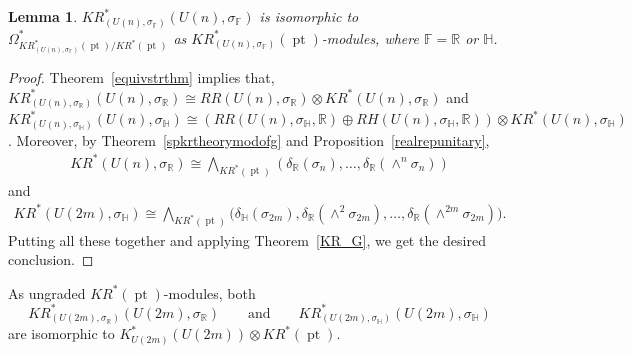 \documentclass[pdftex]{sigma}
\numberwithin{equation}{section}
\newtheorem{Lemma}[Theorem]{Lemma}
\DeclareMathOperator{\pt}{pt}
\begin{document}
\begin{Lemma}
$KR^*_{(U(n),
\sigma_\mathbb{\mathbb{F}})}\!(U(n){,}
\sigma_\mathbb{F})$ is isomorphic to $\Omega^*_{KR^*_{(U(n),
\sigma_\mathbb{F})}(\pt)/ KR^*(\pt)}\!$ as $KR^*_{(U(n),
\sigma_\mathbb{F})}(\pt)$-modules,
where $\mathbb{F}=\mathbb{R}$ or $\mathbb{H}$.
\end{Lemma}
\begin{proof}
Theorem~\ref{equivstrthm} implies that, $KR^*_{(U(n),
\sigma_\mathbb{R})}(U(n),
\sigma_\mathbb{R})\cong RR(U(n),
\sigma_\mathbb{R})\otimes KR^*(U(n),
\sigma_\mathbb{R})$ and $KR^*_{(U(n),
\sigma_\mathbb{H})}(U(n),
\sigma_\mathbb{H})\cong (RR(U(n),
\sigma_\mathbb{H}, \mathbb{R})\oplus RH(U(n),
\sigma_\mathbb{H}, \mathbb{R}))\otimes KR^*(U(n),
\sigma_\mathbb{H})$.
Moreover, by Theorem~\ref{spkrtheorymodofg} and Proposition~\ref{realrepunitary},
\begin{gather*}
KR^*(U(n),
\sigma_\mathbb{R})\cong \bigwedge\nolimits_{KR^*(\pt)}(\delta_\mathbb{R}(\sigma_n), \dots, \delta_\mathbb{R}
(\wedge^n
\sigma_n))
\end{gather*}
and
\begin{gather*}
KR^*(U(2m),
\sigma_\mathbb{H})\cong\bigwedge\nolimits_{KR^*(\pt)}\big(\delta_\mathbb{H}(\sigma_{2m}), \delta_\mathbb{R}(\wedge^2
\sigma_{2m}), \dots, \delta_\mathbb{R}(\wedge^{2m}\sigma_{2m})\big).
\end{gather*}
Putting all these together and applying Theorem~\ref{KR_G}, we get the desired conclusion.
\end{proof}
\begin{Remark}
\label{ungradediso}
As ungraded $KR^*(\pt)$-modules, both
\[
KR_{(U(2m),
\sigma_\mathbb{R})}^*(U(2m),
\sigma_\mathbb{R}) \qquad \text{and}\qquad KR^*_{(U(2m),
\sigma_\mathbb{H})}(U(2m),
\sigma_\mathbb{H})
\]
 are isomorphic to $K^*_{U(2m)}(U(2m))\otimes KR^*(\pt)$.
\end{Remark}
\end{document}
